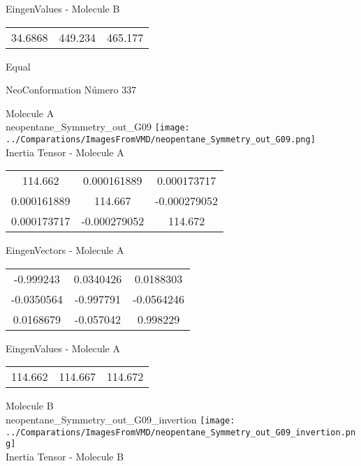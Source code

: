 \begin{multicols}{2}
\begin{center}
\vtab
 EingenValues - Molecule B     \\
\vtab
\begin{tabular}{|c c c|}
34.6868	 & 	449.234	 & 	465.177	 \\
\end{tabular}

\end{center}
\end{multicols}
\begin{center}
\vtab
\vtab
\textcolor{NavyBlue}{\Large Equal}
\end{center}

 \newpage

\vtab[-2cm]
\begin{center}
{\large NeoConformation \tab Número 337}
\end{center}
\begin{multicols}{2}
\begin{center}

Molecule A \\ 
neopentane\_Symmetry\_out\_G09
\texttt{[image: ../Comparations/ImagesFromVMD/neopentane\_Symmetry\_out\_G09.png]}
\\
Inertia Tensor - Molecule A \\
\vtab

\begin{tabular}{|c c c|}
114.662	 & 	0.000161889	 & 	0.000173717	 \\
0.000161889	 & 	114.667	 & 	-0.000279052	 \\
0.000173717	 & 	-0.000279052	 & 	114.672
\end{tabular}

\vtab
 EingenVectors - Molecule A     \\
\vtab
\begin{tabular}{|c c c|}
-0.999243	 & 	0.0340426	 & 	0.0188303	 \\
-0.0350564	 & 	-0.997791	 & 	-0.0564246	 \\
0.0168679	 & 	-0.057042	 & 	0.998229
\end{tabular}

\vtab
 EingenValues - Molecule A     \\
\vtab
\begin{tabular}{|c c c|}
114.662	 & 	114.667	 & 	114.672	 \\
\end{tabular}
\columnbreak

Molecule B \\ 
neopentane\_Symmetry\_out\_G09\_invertion
\texttt{[image: ../Comparations/ImagesFromVMD/neopentane\_Symmetry\_out\_G09\_invertion.png]}
\\
Inertia Tensor - Molecule B \\
\vtab


\end{center}
\end{multicols}
